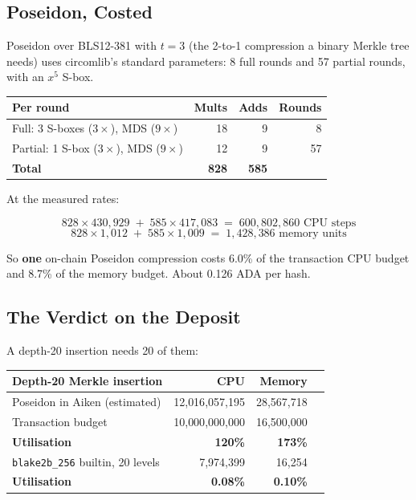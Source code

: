\subsection*{Poseidon, Costed}

Poseidon over BLS12-381 with $t = 3$ (the 2-to-1 compression a binary Merkle
tree needs) uses circomlib's standard parameters: 8 full rounds and 57 partial
rounds, with an $x^5$ S-box.

\begin{center}
\begin{tabular}{lrrr}
  \hline
  \textbf{Per round} & \textbf{Mults} & \textbf{Adds} & \textbf{Rounds} \\
  \hline
  Full: 3 S-boxes ($3\times$), MDS ($9\times$) & 18 & 9 & 8 \\
  Partial: 1 S-box ($3\times$), MDS ($9\times$) & 12 & 9 & 57 \\
  \hline
  \textbf{Total} & \textbf{828} & \textbf{585} & \\
  \hline
\end{tabular}
\end{center}

At the measured rates:

\[
  828 \times 430{,}929 \;+\; 585 \times 417{,}083
  \;=\; 600{,}802{,}860 \text{ CPU steps}
\]
\[
  828 \times 1{,}012 \;+\; 585 \times 1{,}009
  \;=\; 1{,}428{,}386 \text{ memory units}
\]

So \textbf{one} on-chain Poseidon compression costs 6.0\% of the transaction CPU
budget and 8.7\% of the memory budget. About 0.126 ADA per hash.

\subsection*{The Verdict on the Deposit}

A depth-20 insertion needs 20 of them:

\begin{center}
\begin{tabular}{lrrr}
  \hline
  \textbf{Depth-20 Merkle insertion} & \textbf{CPU} & \textbf{Memory} \\
  \hline
  Poseidon in Aiken (estimated) & 12{,}016{,}057{,}195 & 28{,}567{,}718 \\
  Transaction budget            & 10{,}000{,}000{,}000 & 16{,}500{,}000 \\
  \textbf{Utilisation}          & \textbf{120\%}       & \textbf{173\%} \\
  \hline
  \texttt{blake2b\_256} builtin, 20 levels & 7{,}974{,}399 & 16{,}254 \\
  \textbf{Utilisation}          & \textbf{0.08\%}      & \textbf{0.10\%} \\
  \hline
\end{tabular}
\end{center}

